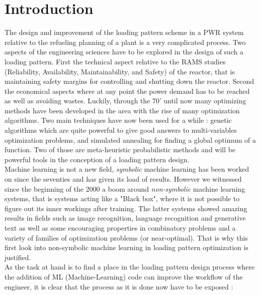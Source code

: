 \section{Introduction}

\noindent The design and improvement of the loading pattern scheme in a PWR system relative to the refueling planning of a plant is a very complicated process. Two aspects of the engineering sciences have to be explored in the design of such a loading pattern. First the technical aspect relative to the RAMS studies (Reliability, Availability, Maintainability, and Safety) of the reactor, that is maintaining safety margins for controlling and shutting down the reactor. Second the economical aspects where at any point the power demand has to be reached as well as avoiding wastes. Luckily, through the 70' until now many optimizing methods have been developed in the area with the rise of many optimization algorithms. Two main techniques have now been used for a while : genetic algorithms which are quite powerful to give good answers to multi-variables optimization problems, and simulated annealing for finding a global optimum of a function. Two of those are meta-heuristic probabilistic methods and will be powerful tools in the conception of a loading pattern design. \\

\noindent Machine learning is not a new field, \textit{symbolic} machine learning has been worked on since the seventies and has given its load of results. However we witnessed since the beginning of the 2000 a boom around \textit{non-symbolic} machine learning systems, that is systems acting like a "Black box", where it is not possible to figure out its inner workings after training. The latter systems showed amazing results in fields such as image recognition, language recognition and generative text as well as some encouraging properties in combinatory problems and a variety of families of optimization problems (or near-optimal). That is why this first look into non-symbolic machine learning in loading pattern optimization is justified. \cite{anderson19}\\

\noindent As the task at hand is to find a place in the loading pattern design process where the addition of ML (Machine-Learning) code can improve the workflow of the engineer, it is clear that the process as it is done now have to be exposed : \\

